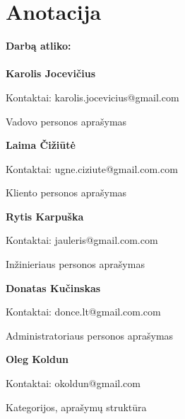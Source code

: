 

\newcommand{\anotacijaIndelis}[3]{
	\textbf{#1}
	\begin{flushleft}
	\hspace*{1cm}
	Kontaktai: #2
	\\
	\hspace*{1cm}
	Indėlis: #3
	\end{flushleft}
}

\newcommand{\anotacija}[2]{
	\textbf{#1}
	\begin{flushleft}
	\hspace*{1cm}
	Kontaktai: #2
	\end{flushleft}
}

\section*{Anotacija}
	
		\textbf{Darbą atliko:}\\\\
		\anotacija{Karolis Jocevičius}{karolis.jocevicius@gmail.com}{Vadovo personos aprašymas}
		\anotacija{Laima Čižiūtė}{ugne.ciziute@gmail.com.com}{Kliento personos aprašymas}
		\anotacija{Rytis Karpuška}{jauleris@gmail.com.com}{Inžinieriaus personos aprašymas}
		\anotacija{Donatas Kučinskas}{donce.lt@gmail.com.com}{Administratoriaus personos aprašymas}
		\anotacija{Oleg Koldun}{okoldun@gmail.com}{Kategorijos, aprašymų struktūra}